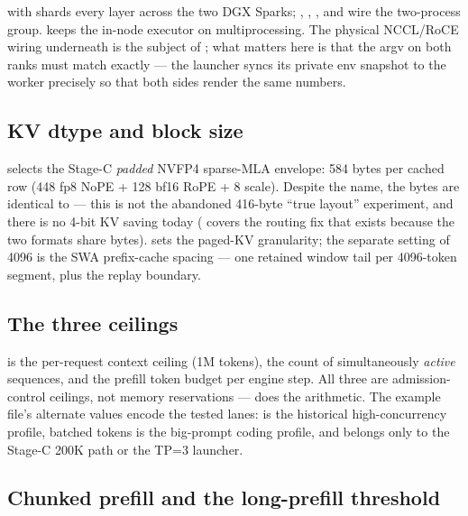  with  shards
every layer across the two DGX Sparks; ,
, , and  wire the
two-process group.  keeps the
in-node executor on multiprocessing. The physical NCCL/RoCE wiring underneath
is the subject of ; what matters here is that the argv on both
ranks must match exactly --- the launcher syncs its private env snapshot to the
worker precisely so that both sides render the same numbers.

\subsection{KV dtype and block size}

 selects the Stage-C \emph{padded} NVFP4
sparse-MLA envelope: 584 bytes per cached row (448 fp8 NoPE + 128 bf16 RoPE +
8 scale). Despite the name, the bytes are identical to  ---
this is not the abandoned 416-byte ``true layout'' experiment, and there is no
4-bit KV saving today ( covers the  routing fix
that exists because the two formats share bytes).  sets
the paged-KV granularity; the separate
 setting of 4096 is the
 SWA prefix-cache spacing --- one retained window tail per
4096-token segment, plus the replay boundary.

\subsection{The three ceilings}

 is the per-request context ceiling (1M tokens),
 the count of simultaneously \emph{active} sequences,
and  the prefill token budget per engine
step. All three are admission-control ceilings, not memory reservations ---
 does the arithmetic. The example file's alternate
values encode the tested lanes:  is the historical
high-concurrency profile,  batched tokens is the big-prompt coding
profile, and  belongs only to the Stage-C 200K path or
the TP=3 launcher.

\subsection{Chunked prefill and the long-prefill threshold}

